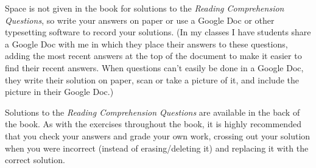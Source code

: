 Space is not given in the book for solutions to the {\em Reading Comprehension Questions}, 
so write your answers on paper or use a Google Doc or other typesetting software to record your solutions.
(In my classes I have students share a Google Doc with me in which they place their answers to these questions,
adding the most recent answers at the top of the document to make it easier to find their recent answers.
When questions can't easily be done in a Google Doc, they write their solution on paper, scan or take a picture of it, 
and include the picture in their Google Doc.)

Solutions to the {\em Reading Comprehension Questions} are available in the back of the book.
As with the exercises throughout the book, it is highly recommended that you check your answers and grade 
your own work, crossing out your solution when you were incorrect (instead of erasing/deleting it)
and replacing it with the correct solution.


